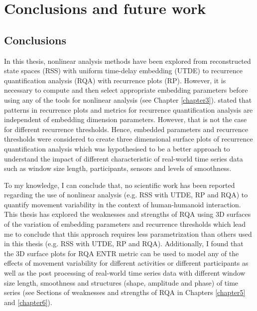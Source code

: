 \chapter{Conclusions and future work} \label{chapter7}

\section{Conclusions}
In this thesis, nonlinear analysis methods have been explored from 
reconstructed state spaces (RSS) with uniform time-delay embedding (UTDE)
to recurrence quantification analysis (RQA) with recurrence plots (RP).
However, it is necessary to compute and then select appropriate 
embedding parameters before using any of the tools for 
nonlinear analysis (see Chapter \ref{chapter3}).
\cite{iwanski1998} stated that 
patterns in recurrence plots and metrics for recurrence quantification
analysis are independent of embedding dimension parameters. 
However, that is not the case for different recurrence thresholds. 
Hence, embedded parameters and recurrence thresholds were considered 
to create three dimensional surface plots of recurrence quantification analysis 
which was hypothesised to be a better approach to understand the impact 
of different characteristic of real-world time series data 
such as window size length, participants, sensors and levels of smoothness.

To my knowledge, I can conclude that, no scientific work has been reported 
regarding the use of nonlinear analysis (e.g. RSS with UTDE, RP and RQA) to 
quantify movement variability in the context of human-humanoid interaction.
This thesis has explored the weaknesses and strengths of RQA
using 3D surfaces of the variation of embedding parameters and recurrence
thresholds which lead me to conclude that this approach requires 
less parametrization than others used in this thesis 
(e.g. RSS with UTDE, RP and RQA). 
Additionally, I found that the 3D surface plots for RQA ENTR metric 
can be used to model any of the effects of movement variability for
different activities or different participants
as well as the post processing of real-world time series data 
with different window size length,
smoothness and structures (shape, amplitude and phase) of time series
(see Sections of weaknesses and strengths of RQA in Chapters 
\ref{chapter5} and \ref{chapter6}).

